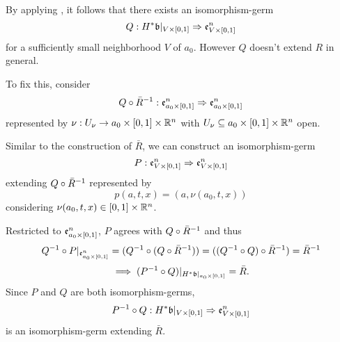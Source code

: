 \begin{myproof}
    By applying ,
    it follows that there exists an isomorphism-germ
    \[ Q: H^*\mathfrak{b}\vert_{V \times{} [0, 1]} \Rightarrow{} \mathfrak{e}^{n}_{V \times{} [0, 1]} \]
    for a sufficiently small neighborhood $V$ of $a_0$.
    However $Q$ doesn't extend $R$ in general.

    To fix this, consider
    \[ Q \circ \bar{R}^{-1}: \mathfrak{e}^{n}_{a_0 \times{} [0, 1]} \Rightarrow{} \mathfrak{e}^{n}_{a_0 \times{} [0, 1]} \]
    represented by $\nu: U_\nu \to a_0 \times{} [0, 1] \times \mathbb{R}^n$
    with $U_\nu \subseteq{} a_0 \times{} [0, 1] \times \mathbb{R}^n$ open.

    Similar to the construction of $\bar{R}$, we can construct an isomorphism-germ
    \[ P: \mathfrak{e}^{n}_{V \times{} [0, 1]} \Rightarrow{} \mathfrak{e}^{n}_{V \times{} [0, 1]} \]
    extending $Q \circ \bar{R}^{-1}$ represented by
    \[ p(a, t, x) = (a, \nu(a_0, t, x)) \]
    considering $\nu(a_0, t, x) \in [0, 1] \times \mathbb{R}^n$.

    Restricted to $\mathfrak{e}^{n}_{a_0 \times{} [0, 1]}$, $P$ agrees with $Q \circ \bar{R}^{-1}$ and thus
    \[
        Q^{-1} \circ P\vert_{\mathfrak{e}^{n}_{a_0 \times{} [0, 1]}}
        = (Q^{-1} \circ (Q \circ \bar{R}^{-1}))
        = ((Q^{-1} \circ Q) \circ \bar{R}^{-1})
        = \bar{R}^{-1}
    \]
    \[ \implies (P^{-1} \circ Q)\vert_{H^*\mathfrak{b}\vert_{a_0 \times{} [0, 1]}} = \bar{R}. \]
    Since $P$ and $Q$ are both isomorphism-germs,
    \[ P^{-1} \circ Q: H^*\mathfrak{b}\vert_{V \times{} [0, 1]} \Rightarrow{} \mathfrak{e}^{n}_{V \times{} [0, 1]} \]
    is an isomorphism-germ extending $\bar{R}$.
\end{myproof}

\begin{myproof}
\end{myproof}